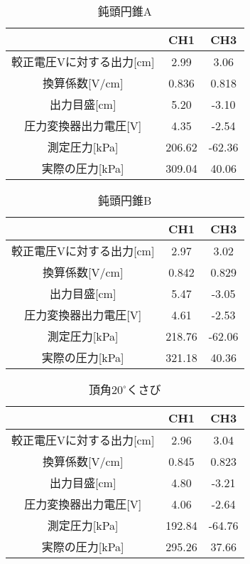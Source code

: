 \documentclass[12pt]{jsarticle}
\begin{document}
\begin{table}[htb]
  \begin{center}
    \caption{鈍頭円錐A}
    \begin{tabular}{|c|c|c|} \hline
       & CH1 & CH3 \\ \hline
      較正電圧Vに対する出力[cm] & 2.99 & 3.06 \\ \hline
      換算係数[V/cm] & 0.836 & 0.818 \\ \hline
      出力目盛[cm] & 5.20 & -3.10 \\ \hline
      圧力変換器出力電圧[V] & 4.35 & -2.54 \\ \hline
      測定圧力[kPa] & 206.62 & -62.36 \\ \hline
      実際の圧力[kPa] & 309.04 & 40.06 \\ \hline
    \end{tabular}
  \end{center}
\end{table}
\begin{table}[htb]
  \begin{center}
    \caption{鈍頭円錐B}
    \begin{tabular}{|c|c|c|} \hline
       & CH1 & CH3 \\ \hline
      較正電圧Vに対する出力[cm] & 2.97 & 3.02 \\ \hline
      換算係数[V/cm] & 0.842 & 0.829 \\ \hline
      出力目盛[cm] & 5.47 & -3.05 \\ \hline
      圧力変換器出力電圧[V] & 4.61 & -2.53 \\ \hline
      測定圧力[kPa] & 218.76 & -62.06 \\ \hline
      実際の圧力[kPa] & 321.18 & 40.36 \\ \hline
    \end{tabular}
  \end{center}
\end{table}
\begin{table}[htb]
  \begin{center}
    \caption{頂角$20^{\circ}$くさび}
    \begin{tabular}{|c|c|c|} \hline
       & CH1 & CH3 \\ \hline
      較正電圧Vに対する出力[cm] & 2.96 & 3.04 \\ \hline
      換算係数[V/cm] & 0.845 & 0.823 \\ \hline
      出力目盛[cm] & 4.80 & -3.21 \\ \hline
      圧力変換器出力電圧[V] & 4.06 & -2.64 \\ \hline
      測定圧力[kPa] & 192.84 & -64.76 \\ \hline
      実際の圧力[kPa] & 295.26 & 37.66 \\ \hline
    \end{tabular}
  \end{center}
\end{table} \newpage \noindent
\end{document}

